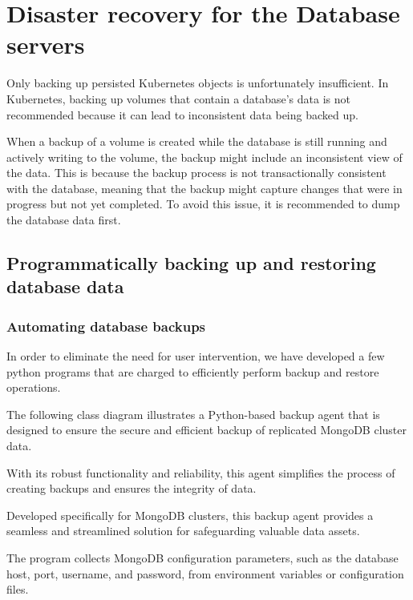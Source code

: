 \section{Disaster recovery for the Database servers }

Only backing up persisted Kubernetes objects is unfortunately insufficient. In Kubernetes, backing up volumes that contain a database's data is not recommended because it can lead to inconsistent data being backed up.

When a backup of a volume is created while the database is still running and actively writing to the volume, the backup might include an inconsistent view of the data. This is because the backup process is not transactionally consistent with the database, meaning that the backup might capture changes that were in progress but not yet completed. To avoid this issue, it is recommended to dump the database data first. 

 \subsection{Programmatically backing up and restoring database data }
\subsubsection{Automating database backups}
In order to eliminate the need for user intervention, we have developed a few python programs that are charged to efficiently perform backup and restore operations. 

The following class diagram illustrates a Python-based backup agent that is designed to ensure the secure and efficient backup of replicated MongoDB cluster data.

With its robust functionality and reliability, this agent simplifies the process of creating backups and ensures the integrity of data.

Developed specifically for MongoDB clusters, this backup agent provides a seamless and streamlined solution for safeguarding valuable data assets.

The program collects MongoDB configuration parameters, such as the database host, port, username, and password, from environment variables or configuration files. 

